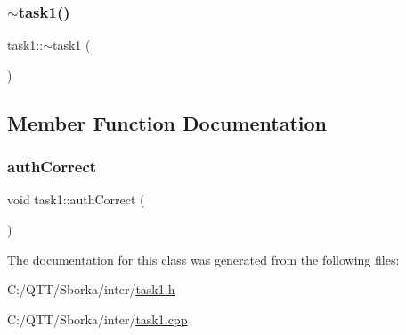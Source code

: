 \mbox{\label{classtask1_ae84aeb78d8edad28e03561851c464f37}} 
\subsubsection{\texorpdfstring{$\sim$task1()}{~task1()}}
{\footnotesize\ttfamily task1\+::$\sim$task1 (\begin{DoxyParamCaption}{ }\end{DoxyParamCaption})}



\subsection{Member Function Documentation}
\mbox{\label{classtask1_ae73fc9c71d989f54e6e80decd4eb5cd1}} 
\subsubsection{\texorpdfstring{auth\+Correct}{authCorrect}}
{\footnotesize\ttfamily void task1\+::auth\+Correct (\begin{DoxyParamCaption}{ }\end{DoxyParamCaption})\hspace{0.3cm}{\ttfamily [signal]}}



The documentation for this class was generated from the following files\+:\begin{DoxyCompactItemize}
\item 
C\+:/\+Q\+T\+T/\+Sborka/inter/\mbox{\hyperlink{task1_8h}{task1.\+h}}\item 
C\+:/\+Q\+T\+T/\+Sborka/inter/\mbox{\hyperlink{task1_8cpp}{task1.\+cpp}}\end{DoxyCompactItemize}
